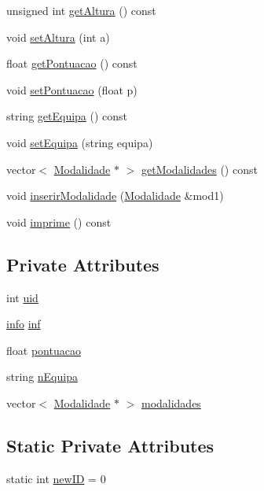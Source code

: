 \begin{DoxyCompactItemize}
\item 
unsigned int \hyperlink{class_atleta_a8ad4b5fcf8bb3cf4bdf6f428728c5ebc}{get\+Altura} () const 
\item 
void \hyperlink{class_atleta_a559420bb8aa5e5ee881ffe284f24a7df}{set\+Altura} (int a)
\item 
float \hyperlink{class_atleta_afc8a2e69817d94c7dad61a66928d98f6}{get\+Pontuacao} () const 
\item 
void \hyperlink{class_atleta_a4bacfffad058d3437083a4a53fd2169c}{set\+Pontuacao} (float p)
\item 
string \hyperlink{class_atleta_a82922d79c0b9570022fc9a5c8e866394}{get\+Equipa} () const 
\item 
void \hyperlink{class_atleta_acfad68eb32ba1ee1485368f1c7dc8b3f}{set\+Equipa} (string equipa)
\item 
vector$<$ \hyperlink{class_modalidade}{Modalidade} $\ast$ $>$ \hyperlink{class_atleta_a4e4a08618d388c914705e4552bee3f00}{get\+Modalidades} () const 
\item 
void \hyperlink{class_atleta_abd96127243b44401924386b4d6e5ceea}{inserir\+Modalidade} (\hyperlink{class_modalidade}{Modalidade} \&mod1)
\item 
void \hyperlink{class_atleta_abfac40f3ca907a1b89152794a5a29f96}{imprime} () const 
\end{DoxyCompactItemize}
\subsection*{Private Attributes}
\begin{DoxyCompactItemize}
\item 
int \hyperlink{class_atleta_ae471f8c198a8a84275afa23598e03d44}{uid}
\item 
\hyperlink{structinfo}{info} \hyperlink{class_atleta_a1492a3f905e1915797e128b7e0be8017}{inf}
\item 
float \hyperlink{class_atleta_ac7fb325ccbe94fe9494d54da4c08b045}{pontuacao}
\item 
string \hyperlink{class_atleta_af159b255beef6455905f0c871355b1ee}{n\+Equipa}
\item 
vector$<$ \hyperlink{class_modalidade}{Modalidade} $\ast$ $>$ \hyperlink{class_atleta_a0f04a0dcd8724d10617db7b1e2482e1c}{modalidades}
\end{DoxyCompactItemize}
\subsection*{Static Private Attributes}
\begin{DoxyCompactItemize}
\item 
static int \hyperlink{class_atleta_af206b52d53b2e4c5dfd4fec66bf1965c}{new\+I\+D} = 0
\end{DoxyCompactItemize}


